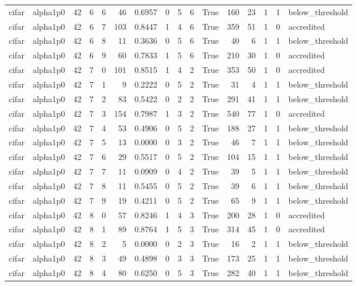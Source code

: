 \begin{tabular}{llrrrrrrrrrrrrrl}
cifar & alpha1p0 & 42 & 6 & 6 & 46 & 0.6957 & 0 & 5 & 6 & True & 160 & 23 & 1 & 1 & below\_threshold \\
cifar & alpha1p0 & 42 & 6 & 7 & 103 & 0.8447 & 1 & 4 & 6 & True & 359 & 51 & 1 & 0 & accredited \\
cifar & alpha1p0 & 42 & 6 & 8 & 11 & 0.3636 & 0 & 5 & 6 & True & 40 & 6 & 1 & 1 & below\_threshold \\
cifar & alpha1p0 & 42 & 6 & 9 & 60 & 0.7833 & 1 & 5 & 6 & True & 210 & 30 & 1 & 0 & accredited \\
cifar & alpha1p0 & 42 & 7 & 0 & 101 & 0.8515 & 1 & 4 & 2 & True & 353 & 50 & 1 & 0 & accredited \\
cifar & alpha1p0 & 42 & 7 & 1 & 9 & 0.2222 & 0 & 5 & 2 & True & 31 & 4 & 1 & 1 & below\_threshold \\
cifar & alpha1p0 & 42 & 7 & 2 & 83 & 0.5422 & 0 & 2 & 2 & True & 291 & 41 & 1 & 1 & below\_threshold \\
cifar & alpha1p0 & 42 & 7 & 3 & 154 & 0.7987 & 1 & 3 & 2 & True & 540 & 77 & 1 & 0 & accredited \\
cifar & alpha1p0 & 42 & 7 & 4 & 53 & 0.4906 & 0 & 5 & 2 & True & 188 & 27 & 1 & 1 & below\_threshold \\
cifar & alpha1p0 & 42 & 7 & 5 & 13 & 0.0000 & 0 & 3 & 2 & True & 46 & 7 & 1 & 1 & below\_threshold \\
cifar & alpha1p0 & 42 & 7 & 6 & 29 & 0.5517 & 0 & 5 & 2 & True & 104 & 15 & 1 & 1 & below\_threshold \\
cifar & alpha1p0 & 42 & 7 & 7 & 11 & 0.0909 & 0 & 4 & 2 & True & 39 & 5 & 1 & 1 & below\_threshold \\
cifar & alpha1p0 & 42 & 7 & 8 & 11 & 0.5455 & 0 & 5 & 2 & True & 39 & 6 & 1 & 1 & below\_threshold \\
cifar & alpha1p0 & 42 & 7 & 9 & 19 & 0.4211 & 0 & 5 & 2 & True & 65 & 9 & 1 & 1 & below\_threshold \\
cifar & alpha1p0 & 42 & 8 & 0 & 57 & 0.8246 & 1 & 4 & 3 & True & 200 & 28 & 1 & 0 & accredited \\
cifar & alpha1p0 & 42 & 8 & 1 & 89 & 0.8764 & 1 & 5 & 3 & True & 314 & 45 & 1 & 0 & accredited \\
cifar & alpha1p0 & 42 & 8 & 2 & 5 & 0.0000 & 0 & 2 & 3 & True & 16 & 2 & 1 & 1 & below\_threshold \\
cifar & alpha1p0 & 42 & 8 & 3 & 49 & 0.4898 & 0 & 3 & 3 & True & 173 & 25 & 1 & 1 & below\_threshold \\
cifar & alpha1p0 & 42 & 8 & 4 & 80 & 0.6250 & 0 & 5 & 3 & True & 282 & 40 & 1 & 1 & below\_threshold \\

\end{tabular}
